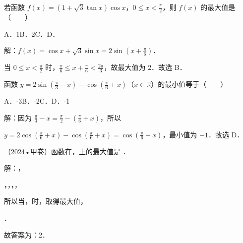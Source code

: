 \begin{question}
若函数 $f(x)=(1+\sqrt3\tan x)\cos x$，$0\leq x<\frac{\pi}{2}$，则 $f(x)$ 的最大值是（　　）\par
A．1\qquad{}B．2\qquad{}C．\qquad{}D．\par
\begin{solution}
解：$f(x)=\cos x+\sqrt3\sin x=2\sin(x+\frac{\pi}{6})$．\par
当 $0\leq x<\frac{\pi}{2}$ 时，$\frac{\pi}{6}\leq x+\frac{\pi}{6}<\frac{2\pi}{3}$，故最大值为 $2$．故选 B．\par
\end{solution}
\end{question}

\begin{question}
函数 $y=2\sin(\frac{\pi}{3}-x)-\cos(\frac{\pi}{6}+x)$（$x\in\mathbb R$）的最小值等于（　　）\par
A．-3\qquad{}B．-2\qquad{}C．\qquad{}D．-1\par
\begin{solution}
解：因为 $\frac{\pi}{3}-x=\frac{\pi}{2}-(\frac{\pi}{6}+x)$，所以\par
$y=2\cos(\frac{\pi}{6}+x)-\cos(\frac{\pi}{6}+x)=\cos(\frac{\pi}{6}+x)$，最小值为 $-1$．故选 D．\par
\end{solution}
\end{question}

\begin{question}
（2024•甲卷）函数在\FormulaOCR{image914.wmf}{[0}，\FormulaOCR{image915.wmf}{\pi ]}上的最大值是  ．\par
\begin{solution}
解：，\par
\FormulaOCR{image917.wmf}{x\in [0}，\FormulaOCR{image918.wmf}{\pi ]}，\FormulaOCR{image919.wmf}{x-\frac { \pi  } { 3 }\in [-\frac { \pi  } { 3 }}，\FormulaOCR{image920.wmf}{\frac { 2\pi  } { 3 }]}，\par
所以当，时，取得最大值，\par
{}．\par
故答案为：2．\par
\end{solution}
\end{question}

